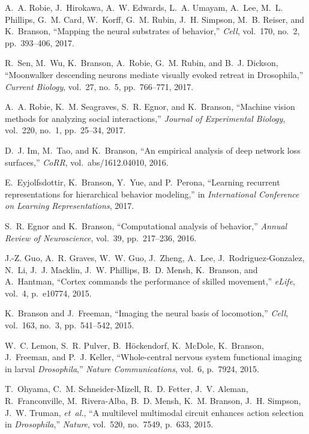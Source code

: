 \begin{cvenum}
\item A.~A. Robie, J.~Hirokawa, A.~W. Edwards, L.~A. Umayam,
  A.~Lee, M.~L. Phillips, G.~M. Card, W.~Korff, G.~M. Rubin, J.~H. Simpson,
  M.~B. Reiser, and K.~Branson, ``Mapping the neural substrates of behavior,''
  {\em Cell}, vol.~170, no.~2, pp.~393--406, 2017.

\item R.~Sen, M.~Wu, K.~Branson, A.~Robie, G.~M. Rubin, and B.~J. Dickson,
  ``Moonwalker descending neurons mediate visually evoked retreat in
  {D}rosophila,'' {\em Current Biology}, vol.~27, no.~5, pp.~766--771, 2017.

\item A.~A. Robie, K.~M. Seagraves, S.~R. Egnor, and K.~Branson, ``Machine vision
  methods for analyzing social interactions,'' {\em Journal of Experimental
  Biology}, vol.~220, no.~1, pp.~25--34, 2017.

\item D.~J. Im, M.~Tao, and K.~Branson, ``An empirical analysis of deep network loss
  surfaces,'' {\em CoRR}, vol.~abs/1612.04010, 2016.

\item E.~Eyjolfsdottir, K.~Branson, Y.~Yue, and P.~Perona,
  ``Learning recurrent representations for hierarchical behavior modeling,'' in
  {\em International Conference on Learning Representations},
  2017.

\item S.~R. Egnor and K.~Branson, ``Computational analysis of behavior,'' {\em Annual
  Review of Neuroscience}, vol.~39, pp.~217--236, 2016.

\item J.-Z. Guo, A.~R. Graves, W.~W. Guo, J.~Zheng, A.~Lee,
  J.~Rodriguez-Gonzalez, N.~Li, J.~J. Macklin, J.~W. Phillips, B.~D. Mensh,
  K.~Branson, and A.~Hantman, ``Cortex commands the performance of skilled
  movement,'' {\em e{L}ife}, vol.~4, p.~e10774, 2015.

\item K.~Branson and J.~Freeman, ``Imaging the neural basis of locomotion,'' {\em
  Cell}, vol.~163, no.~3, pp.~541--542, 2015.

\item W.~C. Lemon, S.~R. Pulver, B.~H{\"o}ckendorf, K.~McDole, K.~Branson,
  J.~Freeman, and P.~J. Keller, ``Whole-central nervous system functional
  imaging in larval {\em {{D}}rosophila},'' {\em Nature Communications}, vol.~6, p.~7924,
  2015.

\item T.~Ohyama, C.~M. Schneider-Mizell, R.~D. Fetter, J.~V. Aleman, R.~Franconville, M.~Rivera-Alba, B.~D. Mensh, K.~M. Branson, J.~H. Simpson, J.~W. Truman, {\em et~al.}, ``A multilevel multimodal circuit enhances action selection in {\em {{D}}rosophila},'' {\em Nature}, vol.~520, no.~7549, p.~633, 2015.


\end{cvenum}
